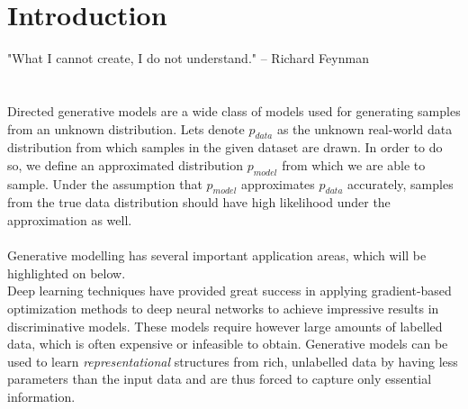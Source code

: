 \section{Introduction}
\label{sec:introduction}

"What I cannot create, I do not understand." -- Richard Feynman \\\\\\



Directed generative models are a wide class of models used for generating samples from an unknown distribution.
Lets denote $p_{data}$ as the unknown real-world data distribution from which samples in the given dataset are drawn.
In order to do so, we define an approximated distribution $p_{model}$ from which we are able to sample.
Under the assumption that $p_{model}$ approximates $p_{data}$ accurately, samples from the true data distribution should have high likelihood under the approximation as well.\\\\

Generative modelling has several important application areas, which will be highlighted on below.\\
Deep learning techniques have provided great success in applying gradient-based optimization methods to deep neural networks to achieve impressive results in discriminative models.
These models require however large amounts of labelled data, which is often expensive or infeasible to obtain.
Generative models can be used to learn \emph{representational} structures from rich, unlabelled data by having less parameters than the input data and are thus forced to capture only essential information.\\
\newpage




